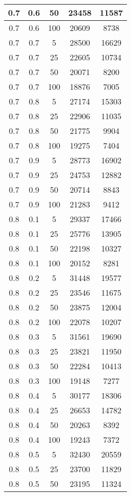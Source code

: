 \begin{appendices}
\begin{longtable}[c]{|c|c|c|c|c|}
	\hline
	0.7& 0.6& 50& 23458&  11587\\
	\hline
	0.7& 0.6& 100& 20609&  8738\\
	\hline
	0.7& 0.7& 5& 28500&  16629\\
	\hline
	0.7& 0.7& 25& 22605&  10734\\
	\hline
	0.7& 0.7& 50& 20071&  8200\\
	\hline
	0.7& 0.7& 100& 18876&  7005\\
	\hline
	0.7& 0.8& 5& 27174&  15303\\
	\hline
	0.7& 0.8& 25& 22906&  11035\\
	\hline
	0.7& 0.8& 50& 21775&  9904\\
	\hline
	0.7& 0.8& 100& 19275&  7404\\
	\hline
	0.7& 0.9& 5& 28773&  16902\\
	\hline
	0.7& 0.9& 25& 24753&  12882\\
	\hline
	0.7& 0.9& 50& 20714&  8843\\
	\hline
	0.7& 0.9& 100& 21283&  9412\\
	\hline
	0.8& 0.1& 5& 29337&  17466\\
	\hline
	0.8& 0.1& 25& 25776&  13905\\
	\hline
	0.8& 0.1& 50& 22198&  10327\\
	\hline
	0.8& 0.1& 100& 20152&  8281\\
	\hline
	0.8& 0.2& 5& 31448&  19577\\
	\hline
	0.8& 0.2& 25& 23546&  11675\\
	\hline
	0.8& 0.2& 50& 23875&  12004\\
	\hline
	0.8& 0.2& 100& 22078&  10207\\
	\hline
	0.8& 0.3& 5& 31561&  19690\\
	\hline
	0.8& 0.3& 25& 23821&  11950\\
	\hline
	0.8& 0.3& 50& 22284&  10413\\
	\hline
	0.8& 0.3& 100& 19148&  7277\\
	\hline
	0.8& 0.4& 5& 30177&  18306\\
	\hline
	0.8& 0.4& 25& 26653&  14782\\
	\hline
	0.8& 0.4& 50& 20263&  8392\\
	\hline
	0.8& 0.4& 100& 19243&  7372\\
	\hline
	0.8& 0.5& 5& 32430&  20559\\
	\hline
	0.8& 0.5& 25& 23700&  11829\\
	\hline
	0.8& 0.5& 50& 23195&  11324\\
	\hline

\end{longtable}
\end{appendices}
